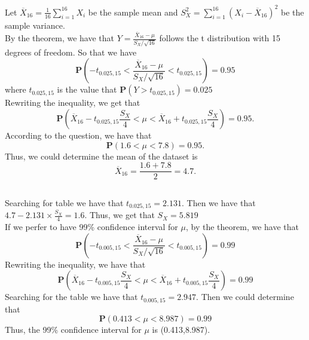 \documentclass[10.5pt]{article}
\begin{document}
\section{}
\subsection{}
Let $\overline{X}_{16}=\frac{1}{16}\sum_{i=1}^{16}X_i$ be the sample mean and $S_{X}^2=\sum_{i=1}^{16}(X_i-\overline{X}_{16})^2$ be the sample variance.\\\indent
By the theorem, we have that $Y=\frac{\overline{X}_{16}-\mu}{S_X/\sqrt{16}}$ follows the t distribution with 15 degrees of freedom. So that we have $$\mathbf{P}\left(-t_{0.025,15}<\frac{\overline{X}_{16}-\mu}{S_X/\sqrt{16}}<t_{0.025,15}\right)=0.95$$\indent
where $t_{0.025,15}$ is the value that $\mathbf{P}(Y>t_{0.025,15})=0.025$\\\indent
Rewriting the inequality, we get that $$\mathbf{P}\left(\overline{X}_{16}-t_{0.025,15}\frac{S_X}{4}<\mu<\overline{X}_{16}+t_{0.025,15}\frac{S_X}{4}\right)=0.95.$$\indent
According to the question, we have that $$\mathbf{P}(1.6<\mu<7.8)=0.95.$$\indent
Thus, we could determine the mean of the dataset is $$\overline{X}_{16}=\frac{1.6+7.8}{2}=4.7.$$
\subsection{}
Searching for table we have that $t_{0.025,15}=2.131$. Then we have that $4.7-2.131\times \frac{S_X}{4}=1.6$. Thus, we get that $S_X=5.819$\\\indent
If we perfer to have 99\% confidence interval for $\mu$, by the theorem, we have that $$\mathbf{P}\left(-t_{0.005,15}<\frac{\overline{X}_{16}-\mu}{S_X/\sqrt{16}}<t_{0.005,15}\right)=0.99$$\indent
Rewriting the inequality, we have that $$\mathbf{P}\left(\overline{X}_{16}-t_{0.005,15}\frac{S_X}{4}<\mu<\overline{X}_{16}+t_{0.005,15}\frac{S_X}{4}\right)=0.99$$\indent
Searching for the table we have that $t_{0.005,15}=2.947$. Then we could determine that $$\mathbf{P}\left(0.413<\mu<8.987\right)=0.99$$\indent
Thus, the 99\% confidence interval for $\mu$ is (0.413,8.987).
\end{document}
